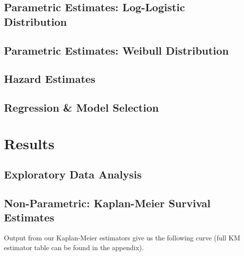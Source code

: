 \documentclass[
]{article}
\begin{document}
\hypertarget{parametric-estimates-log-logistic-distribution}{%
\subsection{Parametric Estimates: Log-Logistic
Distribution}\label{parametric-estimates-log-logistic-distribution}}

\hypertarget{parametric-estimates-weibull-distribution}{%
\subsection{Parametric Estimates: Weibull
Distribution}\label{parametric-estimates-weibull-distribution}}

\hypertarget{hazard-estimates}{%
\subsection{Hazard Estimates}\label{hazard-estimates}}

\hypertarget{regression-model-selection}{%
\subsection{Regression \& Model
Selection}\label{regression-model-selection}}

\hypertarget{results-1}{%
\section{Results}\label{results-1}}

\hypertarget{exploratory-data-analysis}{%
\subsection{Exploratory Data Analysis}\label{exploratory-data-analysis}}

\hypertarget{non-parametric-kaplan-meier-survival-estimates}{%
\subsection{Non-Parametric: Kaplan-Meier Survival
Estimates}\label{non-parametric-kaplan-meier-survival-estimates}}

Output from our Kaplan-Meier estimators give us the following curve
(full KM estimator table can be found in the appendix).
\end{document}

